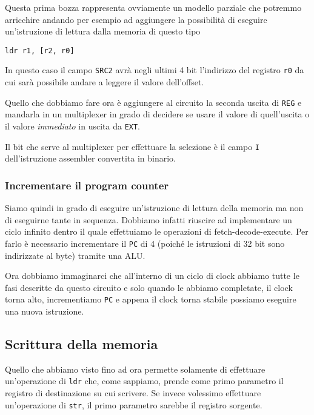 Questa prima bozza rappresenta ovviamente un modello parziale che potremmo arricchire andando per
esempio ad aggiungere la possibilità di eseguire un'istruzione di lettura dalla memoria di questo
tipo
\begin{verbatim}
ldr r1, [r2, r0]
\end{verbatim}
In questo caso il campo \verb|SRC2| avrà negli ultimi 4 bit l'indirizzo del registro \verb|r0| da
cui sarà possibile andare a leggere il valore dell'offset.

Quello che dobbiamo fare ora è aggiungere al circuito la seconda uscita di \verb|REG| e mandarla in
un multiplexer in grado di decidere se usare il valore di quell'uscita o il valore \emph{immediato}
in uscita da \verb|EXT|.
\begin{center}
	
\end{center}
Il bit che serve al multiplexer per effettuare la selezione è il campo \verb|I| dell'istruzione
assembler convertita in binario.

\subsubsection{Incrementare il program counter}
Siamo quindi in grado di eseguire un'istruzione di lettura della memoria ma non di eseguirne
tante in sequenza. Dobbiamo infatti riuscire ad implementare un ciclo infinito dentro il quale
effettuiamo le operazioni di fetch-decode-execute. Per farlo è necessario incrementare il \verb|PC|
di 4 (poiché le istruzioni di 32 bit sono indirizzate al byte) tramite una ALU.
\begin{center}
	
\end{center}
Ora dobbiamo immaginarci che all'interno di un ciclo di clock abbiamo tutte le fasi descritte da
questo circuito e solo quando le abbiamo completate, il clock torna alto, incrementiamo \verb|PC| e
appena il clock torna stabile possiamo eseguire una nuova istruzione.

\subsection{Scrittura della memoria}
Quello che abbiamo visto fino ad ora permette solamente di effettuare un'operazione di \verb|ldr|
che, come sappiamo, prende come primo parametro il registro di destinazione su cui scrivere. Se
invece volessimo effettuare un'operazione di \verb|str|, il primo parametro sarebbe il registro
sorgente.

